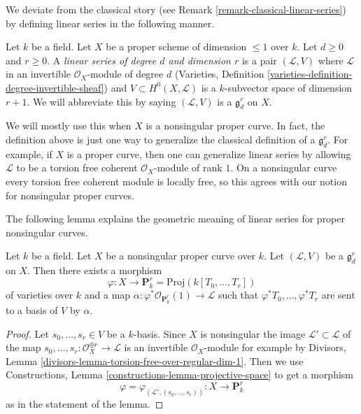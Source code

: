 \noindent
We deviate from the classical story
(see Remark \ref{remark-classical-linear-series})
by defining linear series in the following manner.

\begin{definition}
\label{definition-linear-series}
Let $k$ be a field. Let $X$ be a proper scheme of dimension $\leq 1$ over $k$.
Let $d \geq 0$ and $r \geq 0$.
A {\it linear series of degree $d$ and dimension $r$}
is a pair $(\mathcal{L}, V)$ where $\mathcal{L}$ in an
invertible $\mathcal{O}_X$-module of degree $d$
(Varieties, Definition \ref{varieties-definition-degree-invertible-sheaf})
and $V \subset H^0(X, \mathcal{L})$ is a $k$-subvector space
of dimension $r + 1$. We will abbreviate this by saying
$(\mathcal{L}, V)$ is a {\it $\mathfrak g^r_d$} on $X$.
\end{definition}

\noindent
We will mostly use this when $X$ is a nonsingular proper curve.
In fact, the definition above is just one way to generalize the
classical definition of a $\mathfrak g^r_d$. For example, if $X$
is a proper curve, then one can generalize linear series by allowing
$\mathcal{L}$ to be a torsion free coherent $\mathcal{O}_X$-module
of rank $1$. On a nonsingular curve every torsion free
coherent module is locally free, so this agrees with our
notion for nonsingular proper curves.

\medskip\noindent
The following lemma explains the geometric meaning of linear series
for proper nonsingular curves.

\begin{lemma}
\label{lemma-linear-series}
Let $k$ be a field. Let $X$ be a nonsingular proper curve over $k$.
Let $(\mathcal{L}, V)$ be a $\mathfrak g^r_d$ on $X$. Then
there exists a morphism
$$
\varphi : X \longrightarrow \mathbf{P}^r_k = \text{Proj}(k[T_0, \ldots, T_r])
$$
of varieties over $k$ and a map
$\alpha : \varphi^*\mathcal{O}_{\mathbf{P}^r_k}(1) \to \mathcal{L}$
such that $\varphi^*T_0, \ldots, \varphi^*T_r$
are sent to a basis of $V$ by $\alpha$.
\end{lemma}

\begin{proof}
Let $s_0, \ldots, s_r \in V$ be a $k$-basis. Since $X$ is nonsingular
the image $\mathcal{L}' \subset \mathcal{L}$ of the map
$s_0, \ldots, s_r : \mathcal{O}_X^{\oplus r} \to \mathcal{L}$
is an invertible $\mathcal{O}_X$-module for example by
Divisors, Lemma \ref{divisors-lemma-torsion-free-over-regular-dim-1}.
Then we use
Constructions, Lemma \ref{constructions-lemma-projective-space}
to get a morphism
$$
\varphi = \varphi_{(\mathcal{L}', (s_0, \ldots, s_r))} :
X \longrightarrow \mathbf{P}^r_k
$$
as in the statement of the lemma.
\end{proof}

